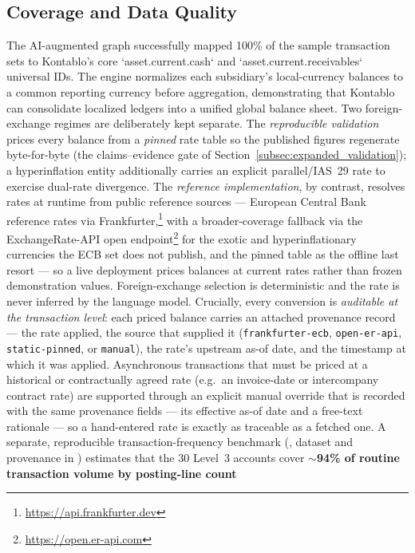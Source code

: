 \subsection{Coverage and Data Quality}
The AI-augmented graph successfully mapped 100\% of the sample transaction sets to Kontablo's core `asset.current.cash` and `asset.current.receivables` universal IDs. The engine normalizes each subsidiary's local-currency balances to a common reporting currency before aggregation, demonstrating that Kontablo can consolidate localized ledgers into a unified global balance sheet. Two foreign-exchange regimes are deliberately kept separate. The \emph{reproducible validation} prices every balance from a \emph{pinned} rate table so the published figures regenerate byte-for-byte (the claims--evidence gate of Section~\ref{subsec:expanded_validation}); a hyperinflation entity additionally carries an explicit parallel/IAS~29 rate to exercise dual-rate divergence. The \emph{reference implementation}, by contrast, resolves rates at runtime from public reference sources --- European Central Bank reference rates via Frankfurter,\footnote{\url{https://api.frankfurter.dev}} with a broader-coverage fallback via the ExchangeRate-API open endpoint\footnote{\url{https://open.er-api.com}} for the exotic and hyperinflationary currencies the ECB set does not publish, and the pinned table as the offline last resort --- so a live deployment prices balances at current rates rather than frozen demonstration values. Foreign-exchange selection is deterministic and the rate is never inferred by the language model. Crucially, every conversion is \emph{auditable at the transaction level}: each priced balance carries an attached provenance record --- the rate applied, the source that supplied it (\texttt{frankfurter-ecb}, \texttt{open-er-api}, \texttt{static-pinned}, or \texttt{manual}), the rate's upstream as-of date, and the timestamp at which it was applied. Asynchronous transactions that must be priced at a historical or contractually agreed rate (e.g.\ an invoice-date or intercompany contract rate) are supported through an explicit manual override that is recorded with the same provenance fields --- its effective as-of date and a free-text rationale --- so a hand-entered rate is exactly as traceable as a fetched one.
A separate, reproducible transaction-frequency benchmark
(, dataset and provenance in
) estimates that the 30 Level~3 accounts
cover \textbf{$\sim$94\% of routine transaction volume by posting-line count}
